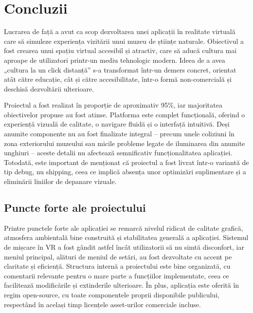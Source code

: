 \chapter{Concluzii}
\label{cap:cap5}

Lucrarea de față a avut ca scop dezvoltarea unei aplicații în realitate virtuală care să simuleze experiența vizitării unui muzeu de științe naturale. Obiectivul a fost crearea unui spațiu virtual accesibil și atractiv, care să aducă cultura mai aproape de utilizatori printr-un mediu tehnologic modern. Ideea de a avea „cultura la un click distanță” s-a transformat într-un demers concret, orientat atât către educație, cât și către accesibilitate, într-o formă non-comercială și deschisă dezvoltării ulterioare.

Proiectul a fost realizat în proporție de aproximativ 95\%, iar majoritatea obiectivelor propuse au fost atinse. Platforma este complet funcțională, oferind o experiență vizuală de calitate, o navigare fluidă și o interfață intuitivă. Deși anumite componente nu au fost finalizate integral – precum unele coliziuni în zona exteriorului muzeului sau micile probleme legate de iluminarea din anumite unghiuri – aceste detalii nu afectează semnificativ funcționalitatea aplicației. Totodată, este important de menționat că proiectul a fost livrat într-o variantă de tip debug, nu shipping, ceea ce implică absența unor optimizări suplimentare și a eliminării liniilor de depanare vizuale.

\section{Puncte forte ale proiectului}
Printre punctele forte ale aplicației se remarcă nivelul ridicat de calitate grafică, atmosfera ambientală bine construită și stabilitatea generală a aplicației. Sistemul de mișcare în VR a fost gândit astfel încât utilizatorii să nu simtă disconfort, iar meniul principal, alături de meniul de setări, au fost dezvoltate cu accent pe claritate și eficiență. Structura internă a proiectului este bine organizată, cu comentarii relevante pentru o mare parte a funcțiilor implementate, ceea ce facilitează modificările și extinderile ulterioare. În plus, aplicația este oferită în regim open-source, cu toate componentele proprii disponibile publicului, respectând în același timp licențele asset-urilor comerciale incluse.

